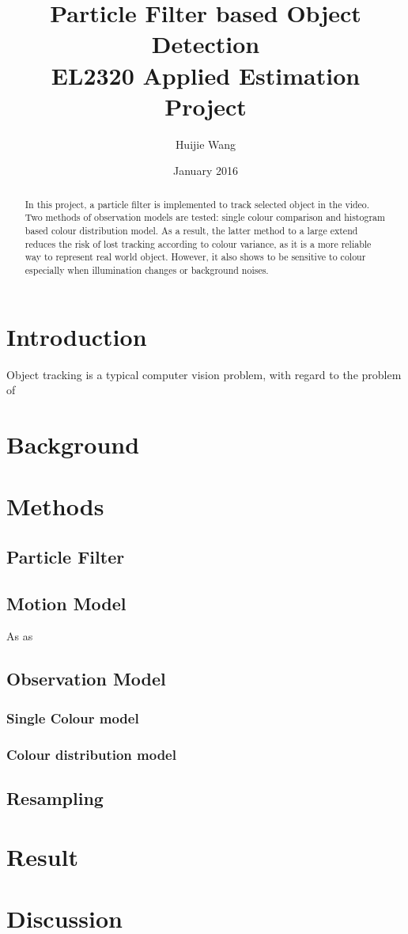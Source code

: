 \documentclass[12pt]{article}
\title{Particle Filter based Object Detection\\
	{\Large EL2320 Applied Estimation Project}}
\author{Huijie Wang}
\date{January 2016}
\begin{document}
\maketitle

\begin{abstract}
	\par
	In this project, a particle filter is implemented to track selected object in the video. Two methods of observation models are tested: single colour comparison and histogram based colour distribution model. As a result, the latter method to a large extend reduces the risk of lost tracking according to colour variance, as it is a more reliable way to represent real world object. However, it also shows to be sensitive to colour especially when illumination changes or background noises.
\end{abstract}

\section{Introduction}
\par
Object tracking is a typical computer vision problem, with regard to the problem of 

\section{Background}

\section{Methods}

\subsection{Particle Filter}

\subsection{Motion Model}
As as 

\subsection{Observation Model}
\subsubsection{Single Colour model}

\subsubsection{Colour distribution model}

\subsection{Resampling}

\section{Result}

\section{Discussion}


	


	
\end{document}
